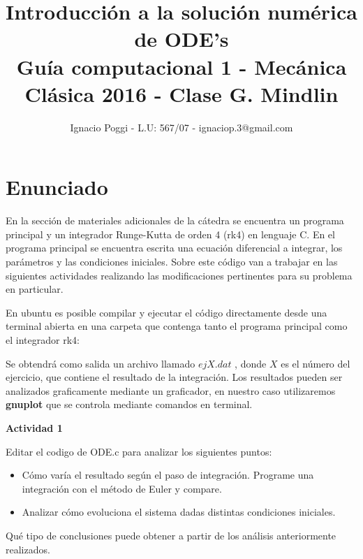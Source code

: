 \documentclass[a4paper,12pt]{article}
\begin{document}
 

\title{Introducci\'on a la soluci\'on num\'erica de ODE's \\
\large Gu\'ia computacional 1 - Mec\'anica Cl\'asica 2016 - Clase G. Mindlin}
\author{Ignacio Poggi - L.U: 567/07 - ignaciop.3@gmail.com}
\maketitle



\section{Enunciado}

En la secci\'on de materiales adicionales de la c\'atedra se encuentra un programa principal y un integrador Runge-Kutta de orden 4 (rk4) en lenguaje C. En el programa principal se encuentra escrita una ecuaci\'on diferencial a integrar, los par\'ametros y las condiciones iniciales. Sobre este c\'odigo van a trabajar en las siguientes actividades realizando las modificaciones pertinentes para su problema en particular.

En ubuntu es posible compilar y ejecutar el c\'odigo directamente desde una terminal abierta en una carpeta que contenga tanto el programa principal como el integrador rk4:\newline


\newline

Se obtendr\'a como salida un archivo llamado $ejX.dat$ , donde $X$ es el n\'umero del ejercicio, que contiene el resultado de la integraci\'on. Los resultados pueden ser analizados graficamente mediante un graficador, en nuestro caso utilizaremos \textbf{gnuplot} que se controla mediante comandos en terminal.\newline


{\Large \textbf{Actividad 1}}

Editar el codigo de ODE.c para analizar los siguientes puntos:

\begin{itemize}
\item C\'omo var\'ia el resultado seg\'un el paso de integraci\'on. Programe una integraci\'on con el m\'etodo de Euler y compare.
\item Analizar c\'omo evoluciona el sistema dadas distintas condiciones iniciales.
\end{itemize}
Qu\'e tipo de conclusiones puede obtener a partir de los an\'alisis anteriormente realizados.\newline
\end{document}
